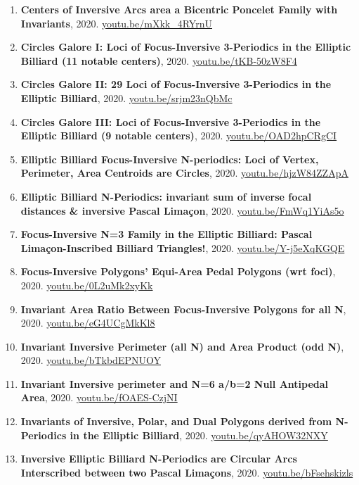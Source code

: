 \documentclass[12pt]{article}
\begin{document}
\begin{enumerate}[resume]
\item \textbf{Centers of Inversive Arcs area a Bicentric Poncelet Family with Invariants}, 2020. \href{https://youtu.be/mXkk_4RYrnU}{\url{youtu.be/mXkk\_4RYrnU}}
\item \textbf{Circles Galore I: Loci of Focus-Inversive 3-Periodics in the Elliptic Billiard (11 notable centers)}, 2020. \href{https://youtu.be/tKB-50zW8F4}{\url{youtu.be/tKB-50zW8F4}}
\item \textbf{Circles Galore II: 29 Loci of Focus-Inversive 3-Periodics in the Elliptic Billiard}, 2020. \href{https://youtu.be/srjm23nQbMc}{\url{youtu.be/srjm23nQbMc}}
\item \textbf{Circles Galore III: Loci of Focus-Inversive 3-Periodics in the Elliptic Billiard (9 notable centers)}, 2020. \href{https://youtu.be/OAD2hpCRgCI}{\url{youtu.be/OAD2hpCRgCI}}
\item \textbf{Elliptic Billiard Focus-Inversive N-periodics: Loci of Vertex, Perimeter, Area Centroids are Circles}, 2020. \href{https://youtu.be/hjzW84ZZApA}{\url{youtu.be/hjzW84ZZApA}}
\item \textbf{Elliptic Billiard N-Periodics: invariant sum of inverse focal distances \& inversive Pascal Limaçon}, 2020. \href{https://youtu.be/FmWq1YiAs5o}{\url{youtu.be/FmWq1YiAs5o}}
\item \textbf{Focus-Inversive N=3 Family in the Elliptic Billiard: Pascal Limaçon-Inscribed Billiard Triangles!}, 2020. \href{https://youtu.be/Y-j5eXqKGQE}{\url{youtu.be/Y-j5eXqKGQE}}
\item \textbf{Focus-Inversive Polygons' Equi-Area Pedal Polygons (wrt foci)}, 2020. \href{https://youtu.be/0L2uMk2xyKk}{\url{youtu.be/0L2uMk2xyKk}}
\item \textbf{Invariant Area Ratio Between Focus-Inversive Polygons for all N}, 2020. \href{https://youtu.be/eG4UCgMkKl8}{\url{youtu.be/eG4UCgMkKl8}}
\item \textbf{Invariant Inversive Perimeter (all N) and Area Product (odd N)}, 2020. \href{https://youtu.be/bTkbdEPNUOY}{\url{youtu.be/bTkbdEPNUOY}}
\item \textbf{Invariant Inversive perimeter and N=6 a/b=2 Null Antipedal Area}, 2020. \href{https://youtu.be/fOAES-CzjNI}{\url{youtu.be/fOAES-CzjNI}}
\item \textbf{Invariants of Inversive, Polar, and Dual Polygons derived from N-Periodics in the Elliptic Billiard}, 2020. \href{https://youtu.be/qyAHOW32NXY}{\url{youtu.be/qyAHOW32NXY}}
\item \textbf{Inversive Elliptic Billiard N-Periodics are Circular Arcs Interscribed between two Pascal Limaçons}, 2020. \href{https://youtu.be/bFsehskizls}{\url{youtu.be/bFsehskizls}}

\end{enumerate}
\end{document}
